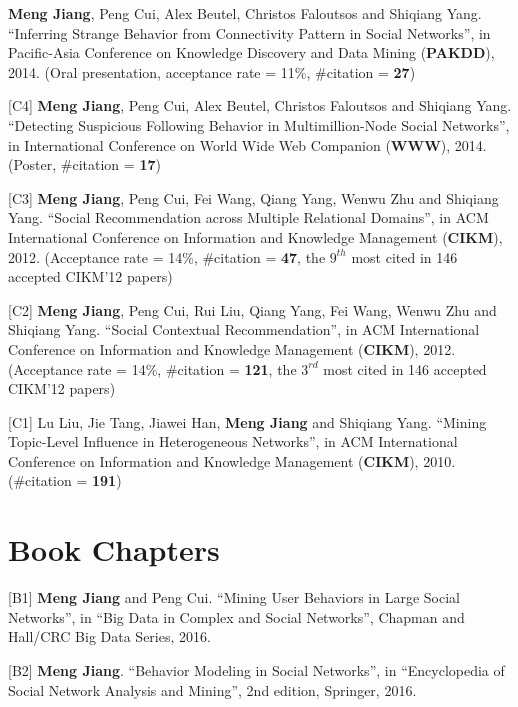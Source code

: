 \documentclass[margin, 10pt]{res}
\begin{document}
\begin{resume}
[C5] \textbf{Meng Jiang}, Peng Cui, Alex Beutel, Christos Faloutsos and Shiqiang Yang. ``Inferring Strange Behavior from Connectivity Pattern in Social Networks'', in Pacific-Asia Conference on Knowledge Discovery and Data Mining (\textbf{PAKDD}), 2014. (Oral presentation, acceptance rate = 11\%, \#citation = \textbf{27})

[C4] \textbf{Meng Jiang}, Peng Cui, Alex Beutel, Christos Faloutsos and Shiqiang Yang. ``Detecting Suspicious Following Behavior in Multimillion-Node Social Networks'', in International Conference on World Wide Web Companion (\textbf{WWW}), 2014. (Poster, \#citation = \textbf{17})

[C3] \textbf{Meng Jiang}, Peng Cui, Fei Wang, Qiang Yang, Wenwu Zhu and Shiqiang Yang. ``Social Recommendation across Multiple Relational Domains'', in ACM International Conference on Information and Knowledge Management (\textbf{CIKM}), 2012. (Acceptance rate = 14\%, \#citation = \textbf{47}, the \textbf{$9^{th}$} most cited in 146 accepted CIKM'12 papers)

[C2] \textbf{Meng Jiang}, Peng Cui, Rui Liu, Qiang Yang, Fei Wang, Wenwu Zhu and Shiqiang Yang. ``Social Contextual Recommendation'', in ACM International Conference on Information and Knowledge Management (\textbf{CIKM}), 2012. (Acceptance rate = 14\%, \#citation = \textbf{121}, the \textbf{$3^{rd}$} most cited in 146 accepted CIKM'12 papers)

[C1] Lu Liu, Jie Tang, Jiawei Han, \textbf{Meng Jiang} and Shiqiang Yang. ``Mining Topic-Level Influence in Heterogeneous Networks'', in ACM International Conference on Information and Knowledge Management (\textbf{CIKM}), 2010. (\#citation = \textbf{191})


\section{Book Chapters}

[B1] \textbf{Meng Jiang} and Peng Cui. ``Mining User Behaviors in Large Social Networks'', in ``Big Data in Complex and Social Networks'', Chapman and Hall/CRC Big Data Series, 2016.

[B2] \textbf{Meng Jiang}. ``Behavior Modeling in Social Networks'', in ``Encyclopedia of Social Network Analysis and Mining'', 2nd edition, Springer, 2016.


\end{resume}
\end{document}
